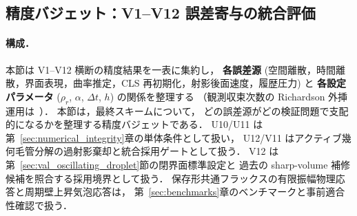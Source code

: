 %
\subsection{精度バジェット：V1--V12 誤差寄与の統合評価}
\label{sec:error_budget}
\label{sec:accuracy_summary}

\paragraph{構成．}
本節は V1--V12 横断の精度結果を一表に集約し，
\textbf{各誤差源} (空間離散，時間離散，界面表現，曲率推定，CLS 再初期化，射影後面速度，履歴圧力) と
\textbf{各設定パラメータ} ($\rho_r$, $\alpha$, $\Delta t$, $h$) の関係を整理する
（観測収束次数の Richardson 外挿運用は~\cite{Roy2003}）．
本節は，最終スキームについて，
どの誤差源がどの検証問題で支配的になるかを整理する精度バジェットである．
U10/U11 は第~\ref{sec:numerical_integrity}章の単体条件として扱い，
U12/V11 はアクティブ幾何毛管分解の過射影棄却と統合採用ゲートとして扱う．
V12 は第~\ref{sec:val_oscillating_droplet}節の閉界面標準設定と
過去の sharp-volume 補修候補を照合する採用境界として扱う．
保存形共通フラックスの有限振幅物理応答と周期壁上昇気泡応答は，
第~\ref{sec:benchmarks}章のベンチマークと事前適合性確認で扱う．


